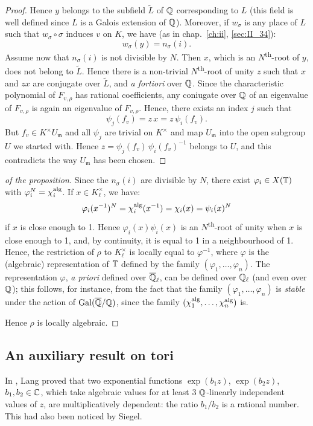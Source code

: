 \begin{proof}
	Hence $y$ belongs to the subfield $\widetilde{L}$ of $\mathbb{Q}$ corresponding
	to $L$ (this field is well defined since $L$ is a Galois extension of
	$\mathbb{Q}$).  Moreover, if $w_\sigma$ is any place of $L$ such that $w_\sigma
	\circ \sigma$ induces $v$ on $K$, we have (as in chap.~\ref{ch:ii},
	\ref{sec:II_34}):
	\[
		w_\sigma(y) = n_\sigma(i).
	\]
	Assume now that $n_\sigma(i)$ is not divisible by $N$. Then $x$, which
	is an $N$\textsuperscript{th}-root of $y$, does not belong to
	$\widetilde{L}$. Hence there is a
	\dpage
	non-trivial $N$\textsuperscript{th}-root of unity $z$ such that $x$ and
	$zx$ are conjugate over $\widetilde{L}$, and \emph{a fortiori} over
	$\mathbb{Q}$. Since the characteristic polynomial of $F_{v, \rho}$ has rational
	coefficients, any coniugate over $\mathbb{Q}$ of an eigenvalue of $F_{v, \rho}$
	is again an eigenvalue of $F_{v, \rho}$. Hence, there exists an index
	$j$ such that
	\[
		\psi_j(f_v) = z\, x = z\, \psi_i(f_v).
	\]
	But $f_v \in K^\times U_{\mathfrak{m}}$ and all $\psi_j$ are trivial on
	$K^\times$ and map $U_{\mathfrak{m}}$ into the open subgroup $U$ we
	started with. Hence $z = \psi_j(f_v) \, \psi_i(f_v)^{-1}$ belongs to
	$U$, and this contradicts the way $U_{\mathfrak{m}}$ has been chosen.
\end{proof}

\begin{proof}[ of the proposition]
	Since the $n_\sigma(i)$ are divisible by $N$, there exist $\varphi_i
	\in X(\mathbb{T})$ with $\varphi_i^N = \chi_i^{\rm alg}$. If $x \in
	K_\ell^\times$, we have:
	\[
		\varphi_i(x^{-1})^N = \chi_i^{\rm alg}(x^{-1}) = \chi_i(x) =
		\psi_i(x)^N
	\]
	if $x$ is close enough to 1. Hence $\varphi_i(x) \psi_i(x)$ is an
	$N$\textsuperscript{th}-root of unity when $x$ is close enough to 1,
	and, by continuity, it is equal to 1 in a neighbourhood of 1. Hence,
	the restriction of $\rho$ to $K_\ell^\times$ is locally equal to
	$\varphi^{-1}$, where $\varphi$ is the (algebraic) representation of
	$\mathbb{T}$ defined by the family $(\varphi_1, \dots, \varphi_n)$. The
	representation $\varphi$, \emph{a priori} defined over $\overline{\mathbb{Q}}_\ell$,
	can be defined over $\mathbb{Q}_\ell$ (and even over $\mathbb{Q}$); this follows, for
	instance, from the fact that the family $(\varphi_1, \dots, \varphi_n)$
	is \emph{stable} under the action of $\operatorname{Gal}(\overline{\mathbb{Q}}/\mathbb{Q})$, since the
	family $(\chi_1^{\rm alg}, \dots, \chi_n^{\rm alg})$ is.

	Hence $\rho$ is locally algebraic.
\end{proof}

\subsection{An auxiliary result on tori}
\label{sec:III_33}
In \cite{15}, Lang proved that two exponential functions $\exp(b_1 z)$,
$\exp(b_2z)$, $b_1, b_2 \in \mathbb{C}$, which take algebraic values for at least 3
$\mathbb{Q}$-linearly independent values of $z$, are multiplicatively dependent: the
ratio $b_1/b_2$ is a rational number. This had also been noticed by Siegel.

